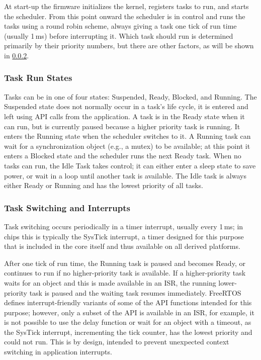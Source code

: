 At start-up the firmware initializes the kernel, registers tasks to run, and starts the scheduler. From this point onward the scheduler is in control and runs the tasks using a round robin scheme, always giving a task one tick of run time (usually 1\,ms) before interrupting it. Which task should run is determined primarily by their priority numbers, but there are other factors, as will be shown in \cref{sec:task_switching}.

\subsubsection{Task Run States}

Tasks can be in one of four states: Suspended, Ready, Blocked, and Running. The Suspended state does not normally occur in a task's life cycle, it is entered and left using API calls from the application. A task is in the Ready state when it can run, but is currently paused because a higher priority task is running. It enters the Running state when the scheduler switches to it. A Running task can wait for a synchronization object (e.g., a mutex) to be available; at this point it enters a Blocked state and the scheduler runs the next Ready task. When no tasks can run, the Idle Task takes control; it can either enter a sleep state to save power, or wait in a loop until another task is available. The Idle task is always either Ready or Running and has the lowest priority of all tasks.

\subsubsection{Task Switching and Interrupts} \label{sec:task_switching}

Task switching occurs periodically in a timer interrupt, usually every 1\,ms; in \armcm chips this is typically the SysTick interrupt, a timer designed for this purpose that is included in the core itself and thus available on all derived platforms.

After one tick of run time, the Running task is paused and becomes Ready, or continues to run if no higher-priority task is available. If a higher-priority task waits for an object and this is made available in an \gls{ISR}, the running lower-priority task is paused and the waiting task resumes immediately. FreeRTOS defines interrupt-friendly variants of some of the \gls{API} functions intended for this purpose; however, only a subset of the \gls{API} is available in an \gls{ISR}, for example, it is not possible to use the delay function or wait for an object with a timeout, as the SysTick interrupt, incrementing the tick counter, has the lowest priority and could not run. This is by design, intended to prevent unexpected context switching in application interrupts.

